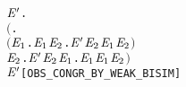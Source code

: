 \begin{alltt}
\HOLTokenTurnstile{}   \HOLSymConst{\HOLTokenImp{}}
   \HOLSymConst{\HOLTokenForall{}} \ensuremath{\HOLBoundVar{E}\sp{\prime}}.
       \ensuremath{(}\HOLSymConst{\HOLTokenForall{}}.
            \ensuremath{(}\HOLSymConst{\HOLTokenForall{}}\ensuremath{\HOLBoundVar{E}\sb{\mathrm{1}}}.  \HOLTokenTransBegin{}\HOLTokenTransEnd \ensuremath{\HOLBoundVar{E}\sb{\mathrm{1}}} \HOLSymConst{\HOLTokenImp{}} \HOLSymConst{\HOLTokenExists{}}\ensuremath{\HOLBoundVar{E}\sb{\mathrm{2}}}. \ensuremath{\HOLBoundVar{E}\sp{\prime}} \HOLTokenWeakTransBegin{}\HOLTokenWeakTransEnd \ensuremath{\HOLBoundVar{E}\sb{\mathrm{2}}} \HOLSymConst{\HOLTokenConj{}}  \ensuremath{\HOLBoundVar{E}\sb{\mathrm{1}}} \ensuremath{\HOLBoundVar{E}\sb{\mathrm{2}}}\ensuremath{)} \HOLSymConst{\HOLTokenConj{}}
            \HOLSymConst{\HOLTokenForall{}}\ensuremath{\HOLBoundVar{E}\sb{\mathrm{2}}}. \ensuremath{\HOLBoundVar{E}\sp{\prime}} \HOLTokenTransBegin{}\HOLTokenTransEnd \ensuremath{\HOLBoundVar{E}\sb{\mathrm{2}}} \HOLSymConst{\HOLTokenImp{}} \HOLSymConst{\HOLTokenExists{}}\ensuremath{\HOLBoundVar{E}\sb{\mathrm{1}}}.  \HOLTokenWeakTransBegin{}\HOLTokenWeakTransEnd \ensuremath{\HOLBoundVar{E}\sb{\mathrm{1}}} \HOLSymConst{\HOLTokenConj{}}  \ensuremath{\HOLBoundVar{E}\sb{\mathrm{1}}} \ensuremath{\HOLBoundVar{E}\sb{\mathrm{2}}}\ensuremath{)} \HOLSymConst{\HOLTokenImp{}}
        \HOLSymConst{\HOLTokenObsCongr} \ensuremath{\HOLBoundVar{E}\sp{\prime}}\hfill{[OBS_CONGR_BY_WEAK_BISIM]}
\end{alltt}

